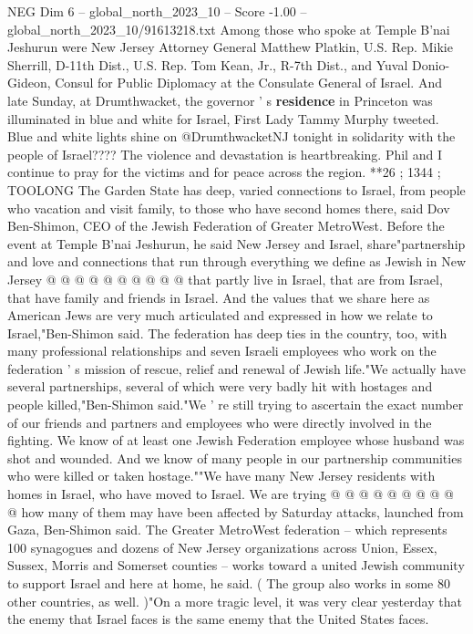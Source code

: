 \begin{textsample}{NEG Dim 6 – global\_north\_2023\_10 – Score -1.00 – global\_north\_2023\_10/91613218.txt}  \label{ex:f6_neg_250}
Among those who spoke at Temple B'nai Jeshurun were New Jersey Attorney General Matthew Platkin, U.S.
Rep.
Mikie Sherrill, D-11th Dist., U.S.
Rep.
Tom Kean, Jr., R-7th Dist., and Yuval Donio-Gideon, Consul for Public Diplomacy at the Consulate General of Israel.
And late Sunday, at Drumthwacket, the governor ' s \textbf{residence} in Princeton was illuminated in blue and white for Israel, First Lady Tammy Murphy tweeted.
Blue and white lights shine on @DrumthwacketNJ tonight in solidarity with the people of Israel????
The violence and devastation is heartbreaking.
Phil and I continue to pray for the victims and for peace across the region. **26 ; 1344 ; TOOLONG The Garden State has deep, varied connections to Israel, from people who vacation and visit family, to those who have second homes there, said Dov Ben-Shimon, CEO of the Jewish Federation of Greater MetroWest.
Before the event at Temple B'nai Jeshurun, he said New Jersey and Israel, share"partnership and love and connections that run through everything we define as Jewish in New Jersey @ @ @ @ @ @ @ @ @ @ that partly live in Israel, that are from Israel, that have family and friends in Israel.
And the values that we share here as American Jews are very much articulated and expressed in how we relate to Israel,"Ben-Shimon said.
The federation has deep ties in the country, too, with many professional relationships and seven Israeli employees who work on the federation ' s mission of rescue, relief and renewal of Jewish life."We actually have several partnerships, several of which were very badly hit with hostages and people killed,"Ben-Shimon said."We ' re still trying to ascertain the exact number of our friends and partners and employees who were directly involved in the fighting.
We know of at least one Jewish Federation employee whose husband was shot and wounded.
And we know of many people in our partnership communities who were killed or taken hostage.""We have many New Jersey residents with homes in Israel, who have moved to Israel.
We are trying @ @ @ @ @ @ @ @ @ @ how many of them may have been affected by Saturday attacks, launched from Gaza, Ben-Shimon said.
The Greater MetroWest federation -- which represents 100 synagogues and dozens of New Jersey organizations across Union, Essex, Sussex, Morris and Somerset counties -- works toward a united Jewish community to support Israel and here at home, he said. ( The group also works in some 80 other countries, as well. )"On a more tragic level, it was very clear yesterday that the enemy that Israel faces is the same enemy that the United States faces.

\end{textsample}
